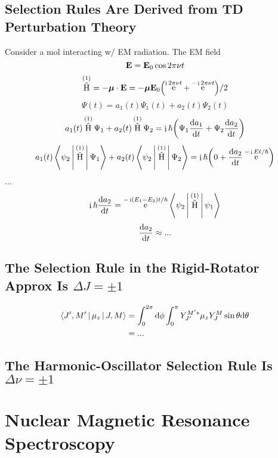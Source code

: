 \documentclass[a4paper]{article}
\DeclareMathOperator{\e}{\mathrm{e}}
\DeclareMathOperator{\I}{\mathrm{i}}
\DeclareMathOperator{\hH}{\hat{H}}
\numberwithin{equation}{section}
\begin{document}
\subsection{Selection Rules Are Derived from TD Perturbation Theory}
Consider a mol interacting w/ EM radiation. The EM field
\begin{equation}\label{key}
\vb{E} = \vb{E}_0\cos 2\pi\nu t
\end{equation}
\begin{equation}\label{key}
\hH^{(1)} = -\bm\mu\cdot\vb{E} = -\bm\mu\vb{E}_0\qty(\e^{\I 2\pi\nu t} + \e^{-\I 2\pi\nu t})/2
\end{equation}
\begin{equation}\label{key}
\Psi(t) = a_1(t)\Psi_1(t) + a_2(t)\Psi_2(t)
\end{equation}
\begin{equation}\label{key}
a_1(t)\hH^{(1)}\Psi_1 + a_2(t)\hH^{(1)}\Psi_2 = \I\hbar\qty(\Psi_1\dv{a_1}{t} + \Psi_2\dv{a_2}{t})
\end{equation}
\begin{equation}\label{key}
a_1(t)\Braket{\psi_2 | \hH^{(1)} | \Psi_1} + a_2(t)\Braket{\psi_2 | \hH^{(1)} | \Psi_2} = \I\hbar\qty(0 + \dv{a_2}{t}\e^{-\I Et/\hbar})
\end{equation}
...
\begin{equation}\label{key}
\I\hbar\dv{a_2}{t} = \e^{-\I(E_1 - E_2)t/\hbar} \Braket{\psi_2 | \hH^{(1)} | \psi_1}
\end{equation}
\begin{equation}\label{key}
\dv{a_2}{t} \approx ...
\end{equation}

\subsection{The Selection Rule in the Rigid-Rotator Approx Is $ \Delta J = \pm 1 $}
\begin{align}
\Braket{J',M' | \mu_z | J,M} &= \int_0^{2\pi} \dd\phi \int_0^\pi Y_{J'}^{M'*} \mu_z Y_J^M \sin\theta\dd\theta \notag\\
&= ...
\end{align}

\subsection{The Harmonic-Oscillator Selection Rule Is $ \Delta\nu = \pm 1 $}

\section{Nuclear Magnetic Resonance Spectroscopy}
\end{document}
